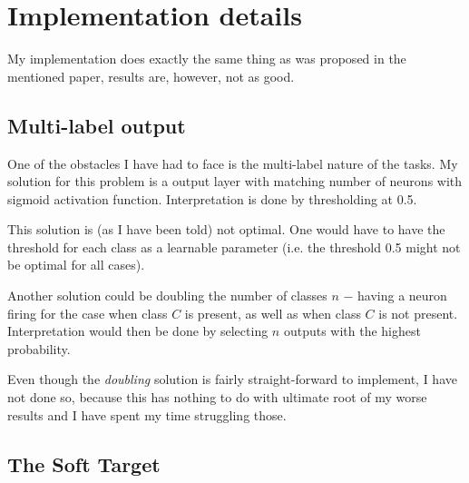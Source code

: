 \documentclass[a4paper,twocolumn]{article}
\begin{document}
\section{Implementation details}
My implementation does exactly the same thing as was proposed in the mentioned
paper, results are, however, not as good.

\subsection{Multi-label output} One of the obstacles I have had to face is the
multi-label nature of the tasks. My solution for this problem is a output layer
with matching number of neurons with sigmoid activation function. Interpretation
is done by thresholding at 0.5.

This solution is (as I have been told) not optimal. One would have to have the
threshold for each class as a learnable parameter (i.e. the threshold 0.5 might
not be optimal for all cases).

Another solution could be doubling the number of classes $n$ $-$ having a neuron
firing for the case when class $C$ is present, as well as when class $C$ is not
present. Interpretation would then be done by selecting $n$ outputs with the
highest probability.

Even though the \textit{doubling} solution is fairly straight-forward to
implement, I have not done so, because this has nothing to do with ultimate root
of my worse results and I have spent my time struggling those.

\subsection{The Soft Target}
\end{document}
